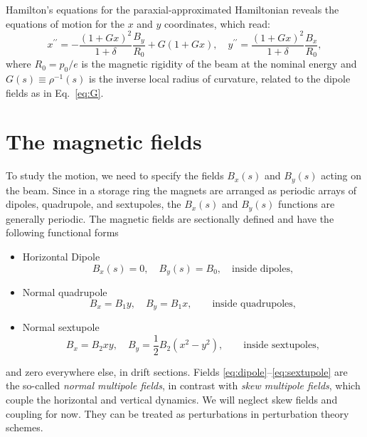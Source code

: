 Hamilton's equations for the paraxial-approximated Hamiltonian reveals the equations of motion for the $x$ and $y$ coordinates, which read:
\begin{equation}
x^{\prime \prime}=-\frac{(1+G x)^{2}}{1+\delta} \frac{B_{y}}{R_0}+G(1+G x),
\quad
y^{\prime \prime}=\frac{(1+G x)^{2}}{1+\delta} \frac{B_{x}}{R_0},
\label{eq:EOMs}
\end{equation}
where $R_0 = p_0/e$ is the magnetic rigidity of the beam at the nominal energy and $G(s)\equiv\rho^{-1}(s)$ is the inverse local radius of curvature, related to the dipole fields as in Eq.~\eqref{eq:G}.

\section{The magnetic fields}
To study the motion, we need to specify the fields $B_x(s)$ and $B_y(s)$ acting on the beam. Since in a storage ring the magnets are arranged as periodic arrays of dipoles, quadrupole, and sextupoles, the $B_x(s)$ and $B_y(s)$ functions are generally periodic. The magnetic fields are sectionally defined and have the following functional forms
\begin{itemize}
    \item Horizontal Dipole
           \begin{equation} B_x(s) = 0, \quad B_y(s) = B_0, \quad \text{inside dipoles},
            \label{eq:dipole}
           \end{equation}
    \item Normal quadrupole
          \begin{equation}B_x = B_1 y, \quad B_y = B_1 x, \quad \quad \text{inside quadrupoles},
            \label{eq:quadrupole}
           \end{equation}
    \item Normal sextupole
          \begin{equation}B_x = B_2xy, \quad B_y = \frac{1}{2}B_2(x^2 - y^2), \quad \quad \text{inside sextupoles},
            \label{eq:sextupole}
           \end{equation}
\end{itemize}
and zero everywhere else, in drift sections. Fields \eqref{eq:dipole}--\eqref{eq:sextupole}  are the so-called \textit{normal multipole fields}, in contrast with \textit{skew multipole fields}, which couple the horizontal and vertical dynamics. We will neglect skew fields and coupling for now. They can be treated as perturbations in perturbation theory schemes.

